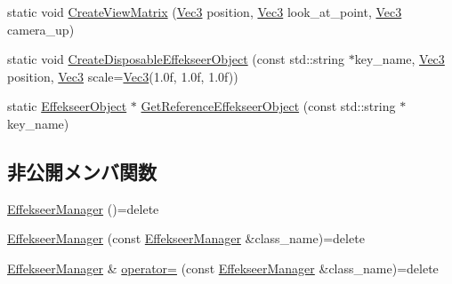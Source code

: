 \begin{DoxyCompactItemize}
\item 
static void \mbox{\hyperlink{class_effekseer_manager_ad36867f996af58d4b788a17cf25244a7}{Create\+View\+Matrix}} (\mbox{\hyperlink{_vector3_d_8h_ab16f59e4393f29a01ec8b9bbbabbe65d}{Vec3}} position, \mbox{\hyperlink{_vector3_d_8h_ab16f59e4393f29a01ec8b9bbbabbe65d}{Vec3}} look\+\_\+at\+\_\+point, \mbox{\hyperlink{_vector3_d_8h_ab16f59e4393f29a01ec8b9bbbabbe65d}{Vec3}} camera\+\_\+up)
\item 
static void \mbox{\hyperlink{class_effekseer_manager_a0b82fe25fbe1dacc0d904fb54267b2fa}{Create\+Disposable\+Effekseer\+Object}} (const std\+::string $\ast$key\+\_\+name, \mbox{\hyperlink{_vector3_d_8h_ab16f59e4393f29a01ec8b9bbbabbe65d}{Vec3}} position, \mbox{\hyperlink{_vector3_d_8h_ab16f59e4393f29a01ec8b9bbbabbe65d}{Vec3}} scale=\mbox{\hyperlink{_vector3_d_8h_ab16f59e4393f29a01ec8b9bbbabbe65d}{Vec3}}(1.\+0f, 1.\+0f, 1.\+0f))
\item 
static \mbox{\hyperlink{class_effekseer_object}{Effekseer\+Object}} $\ast$ \mbox{\hyperlink{class_effekseer_manager_a44878c9abb7f43521c7e8a9700668a28}{Get\+Reference\+Effekseer\+Object}} (const std\+::string $\ast$key\+\_\+name)
\end{DoxyCompactItemize}
\subsection*{非公開メンバ関数}
\begin{DoxyCompactItemize}
\item 
\mbox{\hyperlink{class_effekseer_manager_a4338611775d36aaef84ddb178b7f13ce}{Effekseer\+Manager}} ()=delete
\item 
\mbox{\hyperlink{class_effekseer_manager_ab6e170775c5ba410dc03b59eda589688}{Effekseer\+Manager}} (const \mbox{\hyperlink{class_effekseer_manager}{Effekseer\+Manager}} \&class\+\_\+name)=delete
\item 
\mbox{\hyperlink{class_effekseer_manager}{Effekseer\+Manager}} \& \mbox{\hyperlink{class_effekseer_manager_ade688aba495d8a9d74f2d8de98e9bb75}{operator=}} (const \mbox{\hyperlink{class_effekseer_manager}{Effekseer\+Manager}} \&class\+\_\+name)=delete
\end{DoxyCompactItemize}
